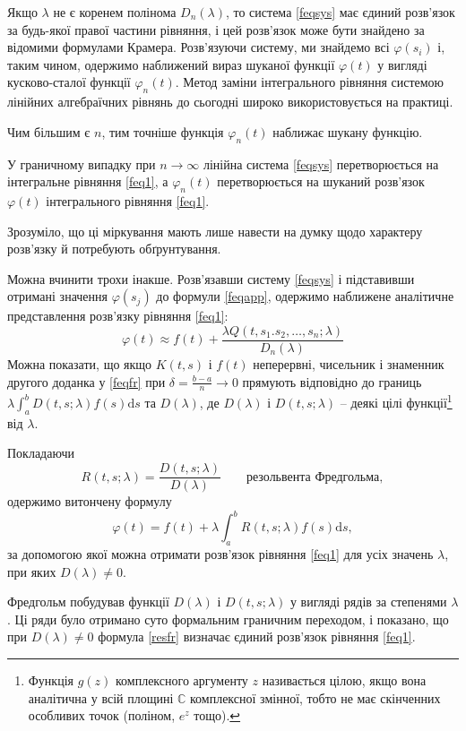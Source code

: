 \documentclass[14pt,twoside]{extreport}
\theoremstyle{mystyle}
\numberwithin{equation}{chapter}
\begin{document}
Якщо $\lambda$ не є коренем полінома $D_n(\lambda)$, то система \eqref{feqsys} має єдиний розв'язок за будь-якої правої частини рівняння, і цей розв'язок може бути знайдено за відомими формулами Крамера. Розв'язуючи систему, ми знайдемо всі $\varphi(s_i)$ і, таким чином, одержимо наближений вираз шуканої функції $\varphi(t)$ у вигляді кусково-сталої функції $\varphi_n(t)$. Метод заміни інтегрального рівняння системою лінійних алгебраїчних рівнянь до сьогодні широко використовується на практиці.

Чим більшим є $n$, тим точніше функція $\varphi_n(t)$ наближає шукану функцію.

У граничному випадку при $n \to \infty$ лінійна система \eqref{feqsys} перетворюється на інтегральне рівняння \eqref{feq1}, а $\varphi_n(t)$ перетворюється на шуканий розв'язок $\varphi(t)$ інтегрального рівняння \eqref{feq1}.

Зрозуміло, що ці міркування мають лише навести на думку щодо характеру розв'язку й потребують обґрунтування.

Можна вчинити трохи інакше. Розв'язавши систему \eqref{feqsys} і підставивши отримані значення $\varphi(s_j)$ до формули \eqref{feqapp}, одержимо наближене аналітичне представлення розв'язку рівняння \eqref{feq1}:
\begin{equation}\label{feqfr}
 \varphi(t)\approx f(t)+\frac{\lambda Q(t,s_{1}.s_{2},\ldots, s_{n};\lambda)}{D_{n}(\lambda)}
\end{equation}
Можна показати, що якщо $K(t,s)$ і $f(t)$ неперервні, чисельник і знаменник другого доданка у \eqref{feqfr} при $\delta = \frac{b-a}{n} \to 0$ прямують відповідно до границь $\lambda\int_{a}^{b}D(t, s;\lambda)f(s)\mathrm{d}s$ та $D(\lambda)$, де $D(\lambda)$ і $D(t, s; \lambda)$ -- деякі цілі функції\footnote{Функція $g(z)$ комплексного аргументу $z$ називається цілою, якщо вона аналітична у всій площині $\mathbb{C}$ комплексної змінної, тобто не має скінченних особливих точок (поліном, $e^z$ тощо).
} від $\lambda$.

Покладаючи
\[
 R(t,s;\lambda) = \frac{D(t,s;\lambda)}{D(\lambda)} \qquad \textrm{резольвента Фредгольма},
\]
одержимо витончену формулу
\begin{equation}\label{resfr}
 \displaystyle \varphi(t)=f(t)+\lambda\int_{a}^{b}R(t, s;\lambda)f(s)\mathrm{d}s,
\end{equation}
за допомогою якої можна отримати розв'язок рівняння \eqref{feq1} для усіх значень $\lambda$, при яких $D(\lambda) \neq 0$.

Фредгольм побудував функції $D(\lambda)$ і $D(t, s; \lambda)$ у вигляді рядів за степенями $\lambda$. Ці ряди було отримано суто формальним граничним переходом, і показано, що при $D(\lambda) \neq 0$ формула \eqref{resfr} визначає єдиний розв'язок рівняння \eqref{feq1}.
\end{document}
